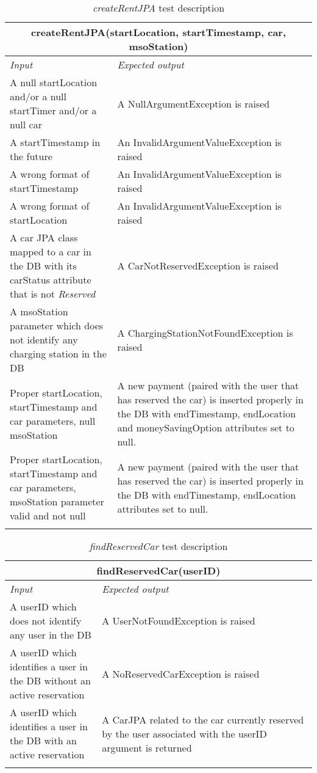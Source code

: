 \begin{longtable}{p{0.35\linewidth}p{0.65\linewidth}}
\multicolumn{2}{c}{\textbf{createRentJPA(startLocation, startTimestamp, car, msoStation)}} \\
\toprule
\emph{Input} & \emph{Expected output} \\
\midrule
A null startLocation and/or a null startTimer and/or a null car & A NullArgumentException is raised\\
\midrule
A startTimestamp in the future & An InvalidArgumentValueException is raised \\
\midrule
A wrong format of startTimestamp & An InvalidArgumentValueException is raised \\
\midrule
A wrong format of startLocation & An InvalidArgumentValueException is raised \\
\midrule
A car JPA class mapped to a car in the DB with its carStatus attribute that is not \emph{Reserved} & A CarNotReservedException is raised \\
\midrule
A msoStation parameter which does not identify any charging station in the DB & A ChargingStationNotFoundException is raised \\
\midrule
Proper startLocation, startTimestamp and car parameters, null msoStation & A new payment (paired with the user that has reserved the car) is inserted properly in the DB with endTimestamp, endLocation and moneySavingOption attributes set to null.\\
\midrule
Proper \mbox{startLocation}, startTimestamp and car parameters, \mbox{msoStation} parameter valid and not null & A new payment (paired with the user that has reserved the car) is inserted properly in the DB with endTimestamp, endLocation attributes set to null.\\
\bottomrule
\caption{\label{tbk:createRentJPA}\emph{createRentJPA} test description}
\end{longtable}

\begin{longtable}{p{0.3\linewidth}p{0.7\linewidth}}
\multicolumn{2}{c}{\textbf{findReservedCar(userID)}} \\
\toprule
\emph{Input} & \emph{Expected output} \\
\midrule
A userID which does not identify any user in the DB & A UserNotFoundException is raised\\
\midrule
A userID which identifies a user in the DB without an active reservation & A NoReservedCarException is raised \\
\midrule
A userID which identifies a user in the DB with an active reservation & A CarJPA related to the car currently reserved by the user associated with the userID argument is returned \\
\bottomrule
\caption{\label{tbl:findReservedCar}\emph{findReservedCar} test description}
\end{longtable}

